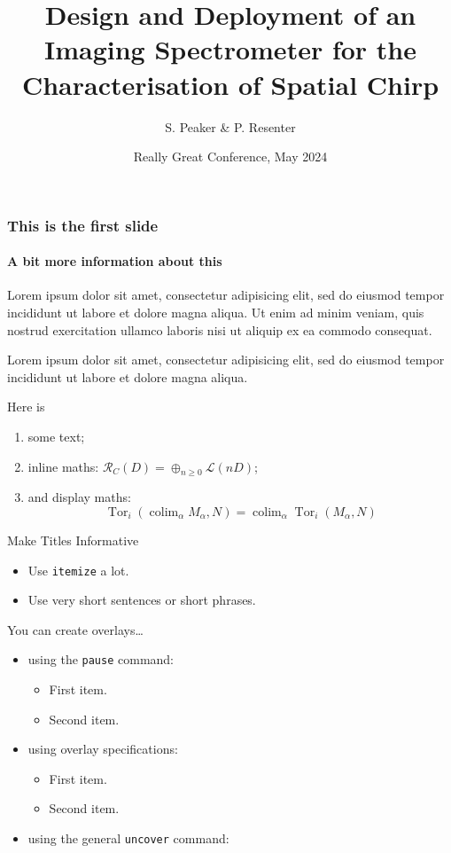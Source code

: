 \documentclass[aspectratio=169]{beamer}
\title[My Talk] %
{Design and Deployment of an Imaging Spectrometer for the
Characterisation of Spatial Chirp } %
\author{ S.  Peaker \& P. Resenter}
\institute{Mathematical Institute\\University of Oxford}
\date[1 May 2024]  %
{Really Great Conference, May 2024} %
\begin{document}
\begin{frame}[plain]
  \titlepage
\end{frame}

\begin{frame}
  \frametitle{This is the first slide}
  \framesubtitle{A bit more information about this}
  
  Lorem ipsum dolor sit amet, consectetur adipisicing elit, sed do
  eiusmod tempor incididunt ut labore et dolore magna aliqua. Ut enim
  ad minim veniam, quis nostrud exercitation ullamco laboris nisi ut
  aliquip ex ea commodo consequat.
  
  Lorem ipsum dolor sit amet, consectetur adipisicing elit, sed do
  eiusmod tempor incididunt ut labore et dolore magna aliqua.
  
  Here is
  \begin{enumerate}
  \item some text;
  \item inline maths: $\mathcal{R}_C(D)=\oplus_{n\geqslant0}\mathcal{L}(nD)$;
  \item and display maths:
    \[
      \operatorname{Tor}_i(\operatorname{colim}_\alpha M_\alpha, N)
      = \operatorname{colim}_\alpha\operatorname{Tor}_i(M_\alpha,N)
    \]
  \end{enumerate}
  
\end{frame}

\begin{frame}{Make Titles Informative}
  
  \begin{itemize}
  \item
    Use \texttt{itemize} a lot.
  \item
    Use very short sentences or short phrases.
  \end{itemize}

  You can create overlays\dots
  \begin{itemize}
  \item using the \texttt{pause} command:
    \begin{itemize}
    \item
      First item.
      \pause
    \item
      Second item.
    \end{itemize}
  \item
    using overlay specifications:
    \begin{itemize}
    \item<3->
      First item.
    \item<4->
      Second item.
    \end{itemize}
  \item
    using the general \texttt{uncover} command:
    \begin{itemize}
    \end{itemize}
  \end{itemize}


\end{frame}
\end{document}
